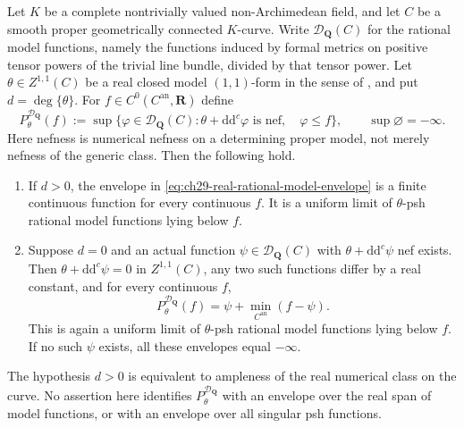 
\begin{theorem}
\label{thm:ch29-real-class-curve-model-envelope}
Let $K$ be a complete nontrivially valued non-Archimedean field, and let
$C$ be a smooth proper geometrically connected $K$-curve.  Write
$\mathcal D_{\mathbf Q}(C)$ for the rational model functions, namely the
functions induced by formal metrics on positive tensor powers of the
trivial line bundle, divided by that tensor power.  Let
$\theta\in Z^{1,1}(C)$ be a real closed model $(1,1)$-form in the sense of
\cite[\S\S2.3--2.7]{GJKM19}, and put $d=\deg\{\theta\}$.
For $f\in C^0(C^{\mathrm{an}},\mathbf R)$ define
\begin{equation}
\label{eq:ch29-real-rational-model-envelope}
 P^{\mathcal D_{\mathbf Q}}_\theta(f)
 :=\sup\{\varphi\in\mathcal D_{\mathbf Q}(C):
             \theta+\mathrm d\mathrm d^c\varphi\text{ is nef},\quad
             \varphi\leq f\},
 \qquad \sup\varnothing=-\infty.
\end{equation}
Here nefness is numerical nefness on a determining proper model, not
merely nefness of the generic class.  Then the following hold.
\begin{enumerate}
\item If $d>0$, the envelope in
\eqref{eq:ch29-real-rational-model-envelope} is a finite continuous function
for every continuous $f$.  It is a uniform limit of $\theta$-psh rational
model functions lying below $f$.
\item Suppose $d=0$ and an actual function
$\psi\in\mathcal D_{\mathbf Q}(C)$ with
$\theta+\mathrm d\mathrm d^c\psi$ nef exists.  Then
$\theta+\mathrm d\mathrm d^c\psi=0$ in $Z^{1,1}(C)$, any two such
functions differ by a real constant, and for every continuous $f$,
\begin{equation}
\label{eq:ch29-real-degree-zero-envelope}
 P^{\mathcal D_{\mathbf Q}}_\theta(f)
       =\psi+\min_{C^{\mathrm{an}}}(f-\psi).
\end{equation}
This is again a uniform limit of $\theta$-psh rational model functions
lying below $f$.  If no such $\psi$ exists, all these envelopes equal
$-\infty$.
\end{enumerate}
The hypothesis $d>0$ is equivalent to ampleness of the real numerical
class on the curve.  No assertion here identifies
$P^{\mathcal D_{\mathbf Q}}_\theta$ with an envelope over the real span
of model functions, or with an envelope over all singular psh functions.
\end{theorem}

